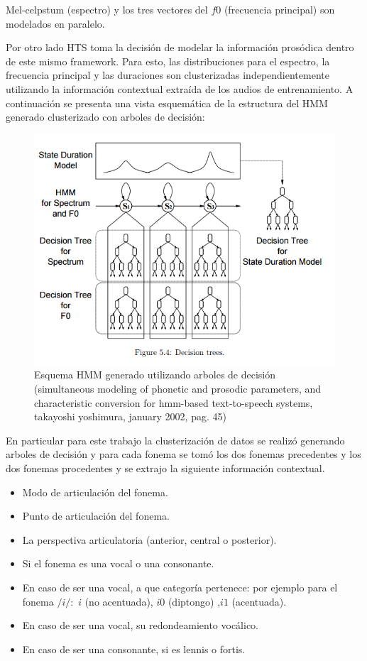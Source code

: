 Mel-celpstum (espectro) y los tres vectores del $f0$ (frecuencia principal) son modelados en paralelo. 

\explicar

Por otro lado HTS toma la decisión de modelar la información prosódica dentro de este mismo framework. Para esto, las distribuciones para el espectro, la frecuencia principal y las duraciones son clusterizadas independientemente utilizando la información contextual extraída de los audios de entrenamiento. A continuación se presenta una vista esquemática de la estructura del HMM generado clusterizado con arboles de decisión:

\begin{figure}
\includegraphics[scale=0.5]{imagenes/hmmContext.png}
\caption{Esquema HMM generado utilizando arboles de decisión (simultaneous modeling of phonetic and prosodic parameters, and characteristic conversion for hmm-based text-to-speech systems, takayoshi yoshimura, january 2002, pag. 45)}
\centering
\end{figure}


En particular para este trabajo la clusterización de datos se realizó generando arboles de decisión y para cada fonema se tomó los dos fonemas precedentes y los dos fonemas procedentes y se extrajo la siguiente información contextual.


\begin{itemize}
\item Modo de articulación del fonema.
\item Punto de articulación del fonema.
\item La perspectiva articulatoria (anterior, central o posterior).
\item Si el fonema es una vocal o una consonante.
\item En caso de ser una vocal, a que categoría pertenece: por ejemplo para el fonema $/i/:$ {$i$ (no acentuada), $i0$ (diptongo) ,$i1$ (acentuada)}.
\item En caso de ser una vocal, su redondeamiento vocálico.
\item En caso de ser una consonante, si es lennis o fortis.
\end{itemize}

